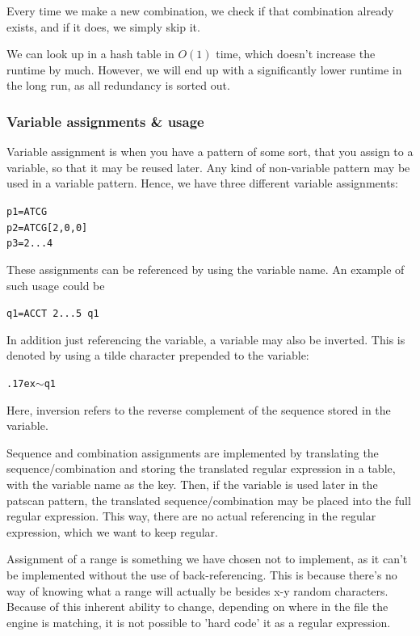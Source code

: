 \documentclass[12pt]{article}
\theoremstyle{definition}
\begin{document}
Every time we make a new combination, we check if that combination already exists, and if it does, we simply skip it.

We can look up in a hash table in $O(1)$ time, which doesn't increase the runtime by much. However, we will end up with a significantly lower runtime in the long run, as all redundancy is sorted out.

\subsubsection{Variable assignments \& usage}

Variable assignment is when you have a pattern of some sort, that you assign to a variable, so that it may be reused later. Any kind of non-variable pattern may be used in a variable pattern. Hence, we have three different variable assignments:

\texttt{p1=ATCG} \\
\texttt{p2=ATCG[2,0,0]} \\
\texttt{p3=2...4}

These assignments can be referenced by using the variable name. An example of such usage could be

\texttt{q1=ACCT 2...5 q1}

In addition just referencing the variable, a variable may also be inverted. This is denoted by using a tilde character prepended to the variable:

\texttt{{\raise.17ex\hbox{$\scriptstyle\mathtt{\sim}$}}q1}

Here, inversion refers to the reverse complement of the sequence stored in the variable.

Sequence and combination assignments are implemented by translating the sequence/combination and storing the translated regular expression in a table, with the variable name as the key. Then, if the variable is used later in the patscan pattern, the translated sequence/combination may be placed into the full regular expression. This way, there are no actual referencing in the regular expression, which we want to keep regular.

Assignment of a range is something we have chosen not to implement, as it can't be implemented without the use of back-referencing. This is because there's no way of knowing what a range will actually be besides x-y random characters. Because of this inherent ability to change, depending on where in the file the engine is matching, it is not possible to 'hard code' it as a regular expression.
\end{document}
